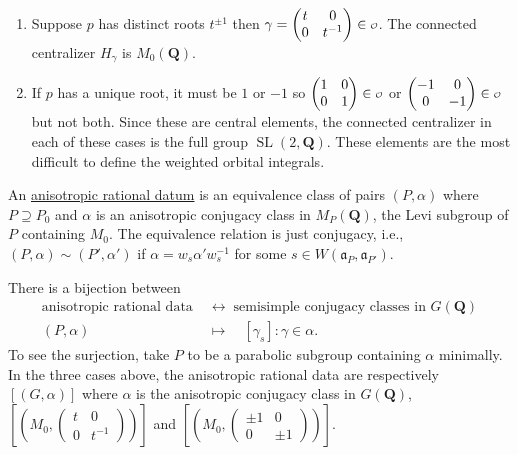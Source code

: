 \documentclass[11pt]{amsart}
\def\Q{\mathbf Q}
\def\o{\scalebox{0.8}{$\scriptstyle\mathcal{O}$}}
\def\aaa{\mathfrak a}
\def\cb#1{{\color{black}#1}}
\def\sl{\operatorname{SL}}
\theoremstyle{remark}
\begin{document}
{\begin{enumerate}
		\[ H_\gamma = \left\{ \begin{pmatrix} a & b \\ b & a - b \end{pmatrix} : a, b \in \Q^*, a^2 - ab - b^2 = 1 \right\}. \]
		There is no $\Q$-split torus inside $H_\gamma$ so this equals $A_G$ and Arthur defines such classes as \underline{anisotropic}. They are the easiest to deal with, as we will see. 
	\item Suppose $p$ has distinct roots $t^{\pm 1}$ then $\gamma = \begin{pmatrix} t & 0 \\ 0 & t^{-1} \end{pmatrix} \in \o$. The connected centralizer $H_\gamma$ is $M_0(\Q)$. 
	\item If $p$ has a unique root, it must be $1$ or $-1$ so $\begin{pmatrix} 1 & 0 \\ 0 & 1 \end{pmatrix} \in \o$ or $\begin{pmatrix} -1 & 0 \\ 0 & -1 \end{pmatrix} \in \o$ but not both. Since these are central elements, the connected centralizer in each of these cases is the full group $\sl(2, \Q)$. These elements are the most difficult to define the weighted orbital integrals. 
\end{enumerate}
}

An \underline{anisotropic rational datum} is an equivalence class of pairs $(P, \alpha)$ where $P \supseteq P_0$ and $\alpha$ is an anisotropic conjugacy class in $M_P(\Q)$, the Levi subgroup of $P$ containing $M_0$. The equivalence relation is just conjugacy, i.e., $(P, \alpha) \sim (P', \alpha')$ if $\alpha = w_s \alpha' w_s^{-1}$ for some $s \in W(\aaa_P, \aaa_{P'})$. 

There is a bijection between 
\begin{align*}
	\text{anisotropic rational data} \; & \leftrightarrow \; \text{semisimple conjugacy classes in } G(\Q) \\
	(P, \alpha) \quad & \mapsto \quad [\gamma_s] : \gamma \in \alpha.
\end{align*}
To see the surjection, take $P$ to be a parabolic subgroup containing $\alpha$ minimally. \cb{In the three cases above, the anisotropic rational data are respectively $[(G, \alpha)]$ where $\alpha$ is the anisotropic conjugacy class in $G(\Q)$, $[(M_0, \begin{pmatrix} t & 0 \\ 0 & t^{-1} \end{pmatrix})]$ and $[(M_0, \begin{pmatrix} \pm 1 & 0 \\ 0 & \pm 1 \end{pmatrix})]$. }
\end{document}
